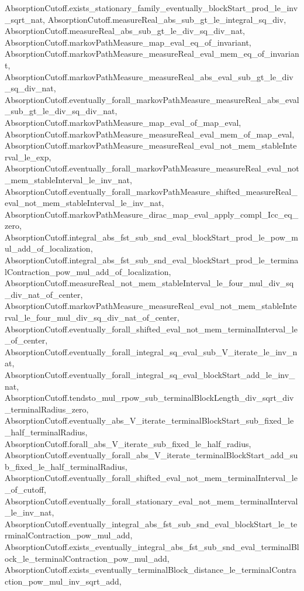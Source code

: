 \begin{lemma}
{    AbsorptionCutoff.exists_stationary_family_eventually_blockStart_prod_le_inv_sqrt_nat,
    AbsorptionCutoff.measureReal_abs_sub_gt_le_integral_sq_div,
    AbsorptionCutoff.measureReal_abs_sub_gt_le_div_sq_div_nat,
    AbsorptionCutoff.markovPathMeasure_map_eval_eq_of_invariant,
    AbsorptionCutoff.markovPathMeasure_measureReal_eval_mem_eq_of_invariant,
    AbsorptionCutoff.markovPathMeasure_measureReal_abs_eval_sub_gt_le_div_sq_div_nat,
    AbsorptionCutoff.eventually_forall_markovPathMeasure_measureReal_abs_eval_sub_gt_le_div_sq_div_nat,
    AbsorptionCutoff.markovPathMeasure_map_eval_of_map_eval,
    AbsorptionCutoff.markovPathMeasure_measureReal_eval_mem_of_map_eval,
    AbsorptionCutoff.markovPathMeasure_measureReal_eval_not_mem_stableInterval_le_exp,
    AbsorptionCutoff.eventually_forall_markovPathMeasure_measureReal_eval_not_mem_stableInterval_le_inv_nat,
    AbsorptionCutoff.eventually_forall_markovPathMeasure_shifted_measureReal_eval_not_mem_stableInterval_le_inv_nat,
    AbsorptionCutoff.markovPathMeasure_dirac_map_eval_apply_compl_Icc_eq_zero,
    AbsorptionCutoff.integral_abs_fst_sub_snd_eval_blockStart_prod_le_pow_mul_add_of_localization,
    AbsorptionCutoff.integral_abs_fst_sub_snd_eval_blockStart_prod_le_terminalContraction_pow_mul_add_of_localization,
    AbsorptionCutoff.measureReal_not_mem_stableInterval_le_four_mul_div_sq_div_nat_of_center,
    AbsorptionCutoff.markovPathMeasure_measureReal_eval_not_mem_stableInterval_le_four_mul_div_sq_div_nat_of_center,
    AbsorptionCutoff.eventually_forall_shifted_eval_not_mem_terminalInterval_le_of_center,
    AbsorptionCutoff.eventually_forall_integral_sq_eval_sub_V_iterate_le_inv_nat,
    AbsorptionCutoff.eventually_forall_integral_sq_eval_blockStart_add_le_inv_nat,
    AbsorptionCutoff.tendsto_mul_rpow_sub_terminalBlockLength_div_sqrt_div_terminalRadius_zero,
    AbsorptionCutoff.eventually_abs_V_iterate_terminalBlockStart_sub_fixed_le_half_terminalRadius,
    AbsorptionCutoff.forall_abs_V_iterate_sub_fixed_le_half_radius,
    AbsorptionCutoff.eventually_forall_abs_V_iterate_terminalBlockStart_add_sub_fixed_le_half_terminalRadius,
    AbsorptionCutoff.eventually_forall_shifted_eval_not_mem_terminalInterval_le_of_cutoff,
    AbsorptionCutoff.eventually_forall_stationary_eval_not_mem_terminalInterval_le_inv_nat,
    AbsorptionCutoff.eventually_integral_abs_fst_sub_snd_eval_blockStart_le_terminalContraction_pow_mul_add,
    AbsorptionCutoff.exists_eventually_integral_abs_fst_sub_snd_eval_terminalBlock_le_terminalContraction_pow_mul_add,
    AbsorptionCutoff.exists_eventually_terminalBlock_distance_le_terminalContraction_pow_mul_inv_sqrt_add,
}
\end{lemma}
